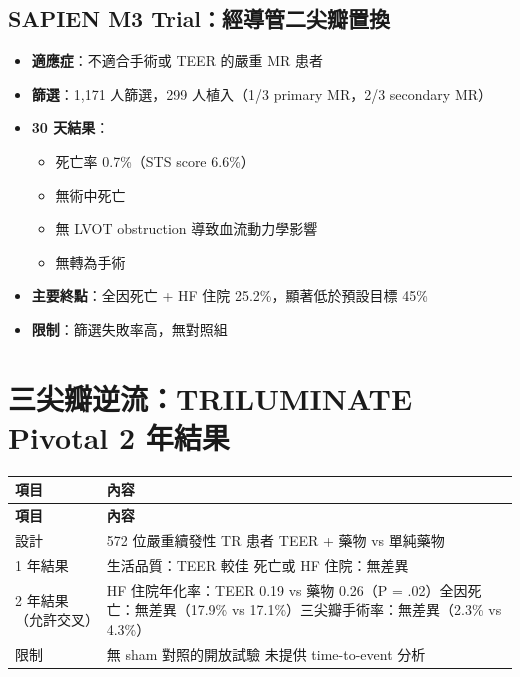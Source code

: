 \documentclass[12pt,a4paper]{article}
\begin{document}
\subsection{SAPIEN M3 Trial：經導管二尖瓣置換}

\begin{itemize}
    \item \textbf{適應症}：不適合手術或 TEER 的嚴重 MR 患者
    \item \textbf{篩選}：1,171 人篩選，299 人植入（1/3 primary MR，2/3 secondary MR）
    \item \textbf{30 天結果}：
    \begin{itemize}
        \item 死亡率 0.7\%（STS score 6.6\%）
        \item 無術中死亡
        \item 無 LVOT obstruction 導致血流動力學影響
        \item 無轉為手術
    \end{itemize}
    \item \textbf{主要終點}：全因死亡 + HF 住院 25.2\%，顯著低於預設目標 45\%
    \item \textbf{限制}：篩選失敗率高，無對照組
\end{itemize}

\section{三尖瓣逆流：TRILUMINATE Pivotal 2 年結果}

\begin{longtable}{p{4cm}p{10cm}}
\toprule
\textbf{項目} & \textbf{內容} \\
\midrule
\endfirsthead
\midrule
\textbf{項目} & \textbf{內容} \\
\midrule
\endhead
\bottomrule
\endfoot
設計 & 572 位嚴重續發性 TR 患者 \newline TEER + 藥物 vs 單純藥物 \\
\midrule
1 年結果 & 生活品質：TEER 較佳 \newline 死亡或 HF 住院：無差異 \\
\midrule
2 年結果（允許交叉） & HF 住院年化率：TEER 0.19 vs 藥物 0.26（P = .02）\newline 全因死亡：無差異（17.9\% vs 17.1\%）\newline 三尖瓣手術率：無差異（2.3\% vs 4.3\%）\\
\midrule
限制 & 無 sham 對照的開放試驗 \newline 未提供 time-to-event 分析 \\
\bottomrule
\end{longtable}
\end{document}
